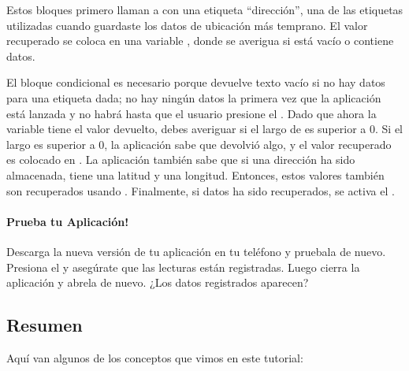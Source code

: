 Estos bloques primero llaman a  con una
etiqueta ``dirección'', una de las etiquetas utilizadas cuando
guardaste los datos de ubicación más temprano. El valor recuperado se
coloca en una variable , donde se averigua
si está vacío o contiene datos.

El bloque condicional es necesario porque  devuelve
texto vacío si no hay datos para una etiqueta dada; no hay ningún
datos la primera vez que la aplicación está lanzada y no habrá hasta
que el usuario presione el . Dado que ahora
la variable  tiene el valor devuelto,
debes averiguar si el largo de  es
superior a 0. Si el largo es superior a 0, la aplicación sabe que
 devolvió algo, y el valor recuperado es colocado en
. La aplicación también sabe
que si una dirección ha sido almacenada, tiene una latitud y una
longitud. Entonces, estos valores también son recuperados usando
. Finalmente, si datos ha sido recuperados,
se activa el .

\paragraph{Prueba tu Aplicación!} Descarga la nueva versión de tu
aplicación en tu teléfono y pruebala de nuevo. Presiona el
 y asegúrate que las lecturas están
registradas. Luego cierra la aplicación y abrela de nuevo. ¿Los datos
registrados aparecen?

\subsection*{Resumen}

Aquí van algunos de los conceptos que vimos en este tutorial:

